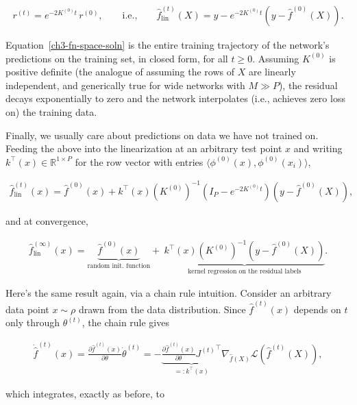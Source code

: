 \begin{align}
r^{(t)} = e^{-2 K^{(0)} t}\, r^{(0)},
\qquad\text{i.e.,}\qquad
\hat{f}^{(t)}_{\text{lin}}(X) = y - e^{-2 K^{(0)} t}\left(y-\hat{f}^{(0)}(X)\right).
\label{ch3-fn-space-soln}
\end{align}

Equation~\eqref{ch3-fn-space-soln} is the entire training trajectory of the
network's predictions on the training set, in closed form, for all $t\geq 0$.
Assuming $K^{(0)}$ is positive definite (the analogue of assuming the rows of $X$ are linearly
independent, and generically true for wide networks with $M\gg P$),
the residual decays exponentially to zero and the network interpolates (i.e., achieves zero loss on) the training data.

Finally, we usually care about predictions on data we have not trained on. Feeding the
above into the linearization at an arbitrary test point $x$ and writing
$k^{\top}(x)\in\mathbb{R}^{1\times P}$ for the row vector with entries
$\langle\phi^{(0)}(x),\phi^{(0)}(x_i)\rangle$,

\begin{align}
\hat{f}^{(t)}_{\text{lin}}(x)
= \hat{f}^{(0)}(x) + k^{\top}(x)\left(K^{(0)}\right)^{-1}
\left(I_P - e^{-2 K^{(0)}t}\right)\left(y-\hat{f}^{(0)}(X)\right),
\end{align}

and at convergence,

\begin{align}
\hat{f}^{(\infty)}_{\text{lin}}(x)
= \underbrace{\hat{f}^{(0)}(x)}_{\text{random init. function}}
+\ \underbrace{k^{\top}(x)\left(K^{(0)}\right)^{-1}
\left(y-\hat{f}^{(0)}(X)\right)}_{\text{kernel regression on the residual labels}}.
\label{ch3-kernel-regression}
\end{align}

Here's the same result again, via a chain rule intuition. Consider an
arbitrary data point $x\sim \rho$ drawn from the data distribution. Since
$\hat{f}^{(t)}(x)$ depends on $t$ only through $\theta^{(t)}$, the chain rule
gives

\begin{align}
\dot{\hat{f}}^{(t)}(x) = \frac{\partial \hat{f}^{(t)}(x)}{\partial \theta}\dot{\theta}^{(t)}
= - \underbrace{\frac{\partial \hat{f}^{(t)}(x)}{\partial \theta} {J^{(t)}}^\top}_{=: k^\top(x)} \nabla_{\hat{f}(X)}\mathcal{L}\left(\hat{f}^{(t)}(X)\right),
\end{align}

which integrates, exactly as before, to

